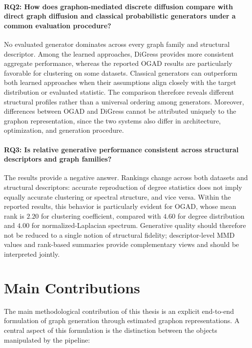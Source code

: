 \paragraph{RQ2: How does graphon-mediated discrete diffusion compare with direct graph diffusion and classical probabilistic generators under a common evaluation procedure?}

No evaluated generator dominates across every graph family and structural descriptor. Among the learned approaches, DiGress provides more consistent aggregate performance, whereas the reported OGAD results are particularly favorable for clustering on some datasets. Classical generators can outperform both learned approaches when their assumptions align closely with the target distribution or evaluated statistic. The comparison therefore reveals different structural profiles rather than a universal ordering among generators. Moreover, differences between OGAD and DiGress cannot be attributed uniquely to the graphon representation, since the two systems also differ in architecture, optimization, and generation procedure.

\paragraph{RQ3: Is relative generative performance consistent across structural descriptors and graph families?}

The results provide a negative answer. Rankings change across both datasets and structural descriptors: accurate reproduction of degree statistics does not imply equally accurate clustering or spectral structure, and vice versa. Within the reported results, this behavior is particularly evident for OGAD, whose mean rank is \(2.20\) for clustering coefficient, compared with \(4.60\) for degree distribution and \(4.00\) for normalized-Laplacian spectrum. Generative quality should therefore not be reduced to a single notion of structural fidelity; descriptor-level MMD values and rank-based summaries provide complementary views and should be interpreted jointly.


\section{Main Contributions}
\label{sec:conclusions_contributions}

The main methodological contribution of this thesis is an explicit end-to-end formulation of graph generation through estimated graphon representations. A central aspect of this formulation is the distinction between the objects manipulated by the pipeline:

